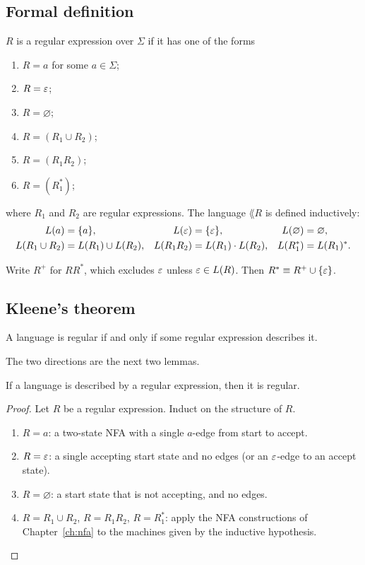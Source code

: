 \subsection{Formal definition}
\begin{definition}
$R$ is a regular expression over $\Sigma$ if it has one of the forms
\begin{enumerate}
  \item $R=a$ for some $a\in\Sigma$;
  \item $R=\varepsilon$;
  \item $R=\varnothing$;
  \item $R=(R_1\cup R_2)$;
  \item $R=(R_1R_2)$;
  \item $R=(R_1^*)$;
\end{enumerate}
where $R_1$ and $R_2$ are regular expressions. The language $\lang{R}$ is
defined inductively:
\[
\begin{aligned}
  L(a)&=\{a\},&
  L(\varepsilon)&=\{\varepsilon\},&
  L(\varnothing)&=\varnothing,\\
  L(R_1\cup R_2)&=L(R_1)\cup L(R_2),&
  L(R_1R_2)&=L(R_1)\mathbin{\cdot}L(R_2),&
  L(R_1^*)&=L(R_1)^*.
\end{aligned}
\]
\end{definition}
Write $R^+$ for $RR^*$, which excludes $\varepsilon$ unless $\varepsilon\in L(R)$. Then
$R^*\equiv R^+\cup\{\varepsilon\}$.

\subsection{Kleene's theorem}
\begin{theorem}[Kleene]
A language is regular if and only if some regular expression describes it.
\end{theorem}
The two directions are the next two lemmas.

\begin{lemma}
If a language is described by a regular expression, then it is regular.
\end{lemma}

\begin{proof}
Let $R$ be a regular expression. Induct on the structure of $R$.
\begin{enumerate}
  \item $R=a$: a two-state NFA with a single $a$-edge from start to accept.
  \item $R=\varepsilon$: a single accepting start state and no edges (or an
        $\varepsilon$-edge to an accept state).
  \item $R=\varnothing$: a start state that is not accepting, and no edges.
  \item $R=R_1\cup R_2$, $R=R_1R_2$, $R=R_1^*$: apply the NFA constructions of
        Chapter~\ref{ch:nfa} to the machines given by the inductive hypothesis.
\end{enumerate}
\end{proof}

